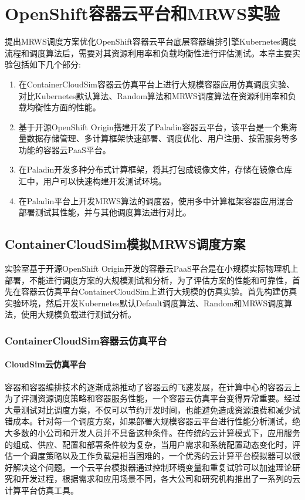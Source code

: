 \chapter{OpenShift容器云平台和MRWS实验}
提出MRWS调度方案优化OpenShift容器云平台底层容器编排引擎Kubernetes调度流程和调度算法后，需要对其资源利用率和负载均衡性进行评估测试。本章主要实验包括如下几个部分:
\begin{enumerate}[(1)]
	\item 在ContainerCloudSim容器云仿真平台上进行大规模容器应用仿真调度实验、对比Kubernetes默认算法、Random算法和MRWS调度算法在资源利用率和负载均衡性方面的性能。
	\item 基于开源OpenShift Origin搭建开发了Paladin容器云平台，该平台是一个集海量数据存储管理、多计算框架快速部署、调度优化、用户注册、按需服务等多功能的容器云PaaS平台。
	\item 在Paladin开发多种分布式计算框架，将其打包成镜像文件，存储在镜像仓库汇中，用户可以快速构建开发测试环境。
	\item 在Paladin平台上开发MRWS算法的调度器，使用多中计算框架容器应用混合部署测试其性能，并与其他调度算法进行对比。
\end{enumerate}

\section{ContainerCloudSim模拟MRWS调度方案}
实验室基于开源OpenShift Origin开发的容器云PaaS平台是在小规模实际物理机上部署，不能进行调度方案的大规模测试和分析，为了评估方案的性能和可靠性，首先在容器云仿真平台ContainerCloudSim上进行大规模的仿真实验。首先构建仿真实验环境，然后开发Kubernetes默认Default调度算法、Random和MRWS调度算法，使用大规模负载进行测试分析。

\subsection{ContainerCloudSim容器云仿真平台}
\subsubsection{CloudSim云仿真平台}
容器和容器编排技术的逐渐成熟推动了容器云的飞速发展，在计算中心的容器云上为了评测资源调度策略和容器服务性能，一个容器云仿真平台变得异常重要。经过大量测试对比调度方案，不仅可以节约开发时间，也能避免造成资源浪费和减少试错成本。针对每一个调度方案，如果部署大规模容器云平台进行性能分析测试，绝大多数的小公司和开发人员并不具备这种条件。在传统的云计算模式下，应用服务的组成、供应、配置和部署条件较为复杂，当用户需求和系统配置动态变化时，评估一个调度策略以及工作负载是相当困难的，一个优秀的云计算平台模拟器可以很好解决这个问题。一个云平台模拟器通过控制环境变量和重复试验可以加速理论研究和开发过程，根据需求和应用场景不同，各大公司和研究机构推出了一系列的云计算平台仿真工具。

